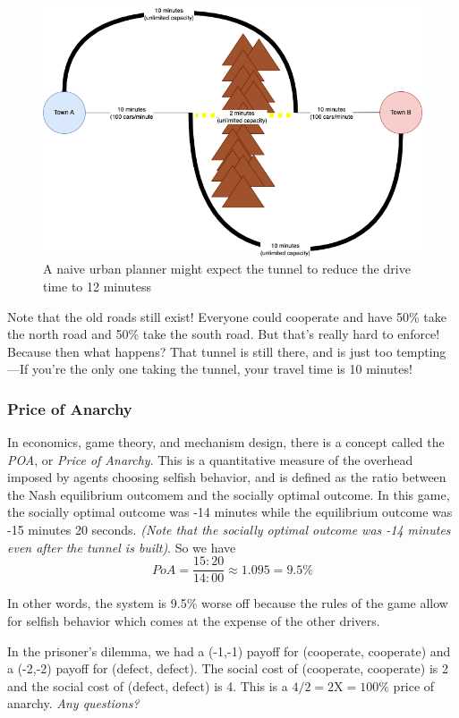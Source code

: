 \documentclass[11pt]{article}
\begin{document}
\begin{figure}
    \centering
    \includegraphics[width=5in]{braess_3.png}
    \caption{A naive urban planner might expect the tunnel to reduce the drive time to 12 minutess}
\end{figure}

Note that the old roads still exist! Everyone could cooperate and have 50\% take the north road and 50\% take the south road. But that's really hard to enforce! 
Because then what happens? 
That tunnel is still there, and is just too tempting---If you're the only one taking the tunnel, your travel time is 10 minutes! 

\subsubsection{Price of Anarchy}

In economics, game theory, and mechanism design, there is a concept called the {\it POA}, or {\it Price of Anarchy}.
This is a quantitative measure of the overhead imposed by agents choosing selfish behavior, and is defined as the ratio between the Nash equilibrium outcomem and the socially optimal outcome. 
In this game, the socially optimal outcome was -14 minutes while the equilibrium outcome was -15 minutes 20 seconds. 
{\it (Note that the socially optimal outcome was -14 minutes even after the tunnel is built)}.
So we have
$$ PoA = \frac{15{:}20}{14{:}00} \approx 1.095 = 9.5\%$$

In other words, the system is 9.5\% worse off because the rules of the game allow for selfish behavior which comes at the expense of the other drivers. 


In the prisoner's dilemma, we had a (-1,-1) payoff for (cooperate, cooperate) and a (-2,-2) payoff for (defect, defect). The social cost of (cooperate, cooperate) is 2 and the social cost of (defect, defect) is 4. This is a $4/2 = 2\text{X} = 100\%$ price of anarchy. {\it Any questions?}
\end{document}
